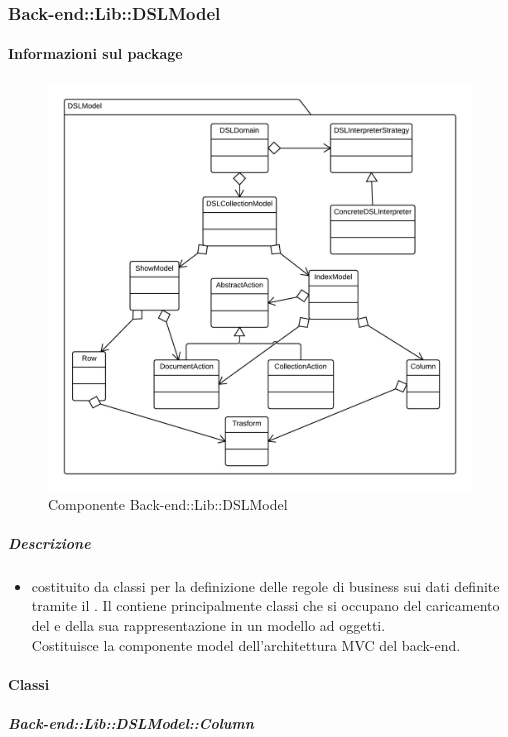   \subsubsection{Back-end::Lib::DSLModel}
  \paragraph{Informazioni sul package} 
    \begin{figure}[H] 
      \begin{center} 
        \includegraphics[width=\textwidth]{packages/Back-end::Lib::DSLModel.png}  
        \caption{Componente Back-end::Lib::DSLModel}
      \end{center}  
    \end{figure} 
  \subparagraph{Descrizione} 
    \begin{itemize}
    \item[]  costituito da classi per la definizione delle regole di business sui dati definite tramite il . 
Il  contiene principalmente classi che si occupano del caricamento del  e della sua rappresentazione in un modello ad oggetti. \\
Costituisce la componente model dell'architettura MVC del back-end.
    \end{itemize} 
    \paragraph{Classi}
      \subparagraph{Back-end::Lib::DSLModel::Column}
        
